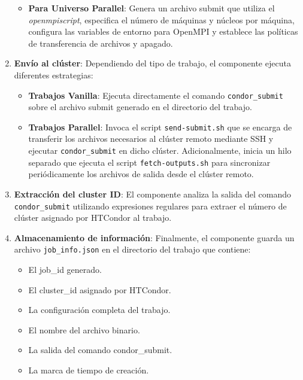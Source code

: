 \begin{enumerate}
\begin{itemize}
		      \item \textbf{Para Universo Parallel}: Genera un archivo submit que utiliza el \textit{openmpiscript}, especifica el número de máquinas y núcleos por máquina, configura las variables de entorno para OpenMPI y establece las políticas de transferencia de archivos y apagado.
	      \end{itemize}

	\item \textbf{Envío al clúster}: Dependiendo del tipo de trabajo, el componente ejecuta diferentes estrategias:

	      \begin{itemize}
		      \item \textbf{Trabajos Vanilla}: Ejecuta directamente el comando \texttt{condor\_submit} sobre el archivo submit generado en el directorio del trabajo.

		      \item \textbf{Trabajos Parallel}: Invoca el script \texttt{send-submit.sh} que se encarga de transferir los archivos necesarios al clúster remoto mediante SSH y ejecutar \texttt{condor\_submit} en dicho clúster. Adicionalmente, inicia un hilo separado que ejecuta el script \texttt{fetch-outputs.sh} para sincronizar periódicamente los archivos de salida desde el clúster remoto.
	      \end{itemize}

	\item \textbf{Extracción del cluster ID}: El componente analiza la salida del comando \texttt{condor\_submit} utilizando expresiones regulares para extraer el número de clúster asignado por HTCondor al trabajo.

	\item \textbf{Almacenamiento de información}: Finalmente, el componente guarda un archivo \texttt{job\_info.json} en el directorio del trabajo que contiene:
	      \begin{itemize}
		      \item El job\_id generado.
		      \item El cluster\_id asignado por HTCondor.
		      \item La configuración completa del trabajo.
		      \item El nombre del archivo binario.
		      \item La salida del comando condor\_submit.
		      \item La marca de tiempo de creación.
	      \end{itemize}
\end{enumerate}

